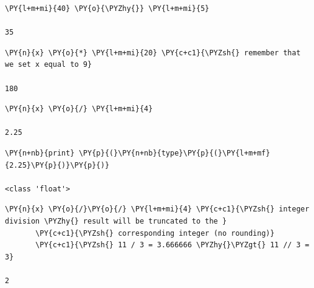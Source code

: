 \begin{codebox}[breakable, size=fbox, boxrule=1pt, pad at break*=1mm, colback=cellbackground, colframe=cellborder]            
\begin{Verbatim}[commandchars=\\\{\}]
\PY{l+m+mi}{40} \PY{o}{\PYZhy{}} \PY{l+m+mi}{5}

35
\end{Verbatim}
\end{codebox}

\begin{codebox}[breakable, size=fbox, boxrule=1pt, pad at break*=1mm, colback=cellbackground, colframe=cellborder]            
\begin{Verbatim}[commandchars=\\\{\}]
\PY{n}{x} \PY{o}{*} \PY{l+m+mi}{20} \PY{c+c1}{\PYZsh{} remember that we set x equal to 9}

180
\end{Verbatim}
\end{codebox}

\begin{codebox}[breakable, size=fbox, boxrule=1pt, pad at break*=1mm, colback=cellbackground, colframe=cellborder]            
\begin{Verbatim}[commandchars=\\\{\}]
\PY{n}{x} \PY{o}{/} \PY{l+m+mi}{4}

2.25
\end{Verbatim}
\end{codebox}

\begin{codebox}[breakable, size=fbox, boxrule=1pt, pad at break*=1mm, colback=cellbackground, colframe=cellborder]            
\begin{Verbatim}[commandchars=\\\{\}]
\PY{n+nb}{print} \PY{p}{(}\PY{n+nb}{type}\PY{p}{(}\PY{l+m+mf}{2.25}\PY{p}{)}\PY{p}{)}

<class 'float'>
\end{Verbatim}
\end{codebox}

\begin{codebox}[breakable, size=fbox, boxrule=1pt, pad at break*=1mm, colback=cellbackground, colframe=cellborder]            
\begin{Verbatim}[commandchars=\\\{\}]
\PY{n}{x} \PY{o}{/}\PY{o}{/} \PY{l+m+mi}{4} \PY{c+c1}{\PYZsh{} integer division \PYZhy{} result will be truncated to the }
       \PY{c+c1}{\PYZsh{} corresponding integer (no rounding)}
       \PY{c+c1}{\PYZsh{} 11 / 3 = 3.666666 \PYZhy{}\PYZgt{} 11 // 3 = 3}

2
\end{Verbatim}
\end{codebox}

